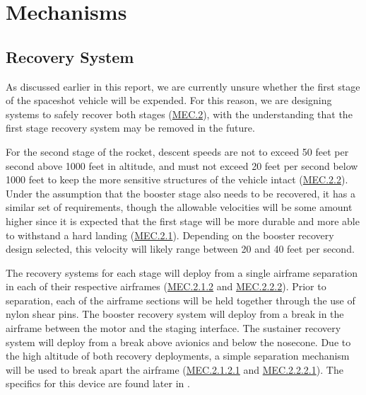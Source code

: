 \section{Mechanisms} \label{section:mechanisms}
\subsection{Recovery System} 

As discussed earlier in this report, we are currently unsure whether the first stage of the space\-shot vehicle will be expended. For this reason, we are designing systems to safely recover both stages (\hyperlink{MEC.2}{MEC.2}), with the understanding that the first stage recovery system may be removed in the future.

For the second stage of the rocket, descent speeds are not to exceed 50 feet per second above 1000 feet in altitude, and must not exceed 20 feet per second below 1000 feet to keep the more sensitive structures of the vehicle intact (\hyperlink{MEC.2.2}{MEC.2.2}). Under the assumption that the booster stage also needs to be recovered, it has a similar set of requirements, though the allowable velocities will be some amount higher since it is expected that the first stage will be more durable and more able to withstand a hard landing (\hyperlink{MEC.2.1}{MEC.2.1}). Depending on the booster recovery design selected, this velocity will likely range between 20 and 40 feet per second.

The recovery systems for each stage will deploy from a single airframe separation in each of their respective airframes (\hyperlink{MEC.2.1.2}{MEC.2.1.2} and \hyperlink{MEC.2.2.2}{MEC.2.2.2}). Prior to separation, each of the airframe sections will be held together through the use of nylon shear pins. The booster recovery system will deploy from a break in the airframe between the motor and the staging interface. The sustainer recovery system will deploy from a break above avionics and below the nosecone. Due to the high altitude of both recovery deployments, a simple separation mechanism will be used to break apart the airframe (\hyperlink{MEC.2.1.2.1}{MEC.2.1.2.1} and \hyperlink{MEC.2.2.2.1}{MEC.2.2.2.1}). The specifics for this device are found later in .

